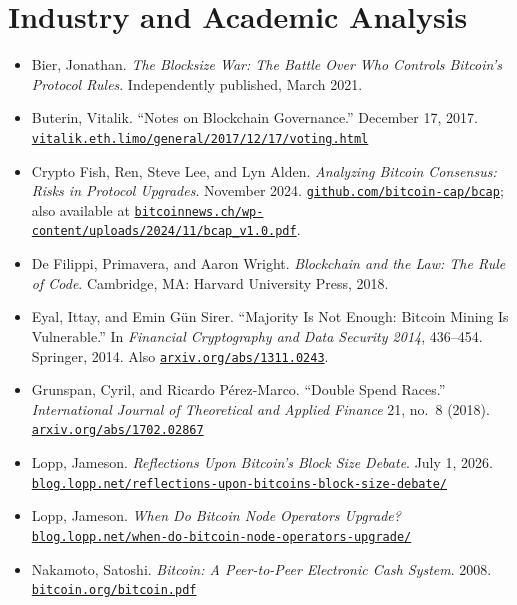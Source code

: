 \documentclass[11pt, twoside, openright]{book}
\begin{document}
\section*{Industry and Academic Analysis}
\begin{itemize}[leftmargin=1.5em, itemsep=4pt]
  \item Bier, Jonathan. \textit{The Blocksize War: The Battle Over Who Controls Bitcoin's Protocol Rules}. Independently published, March 2021.
  \item Buterin, Vitalik. ``Notes on Blockchain Governance.'' December 17, 2017. \href{https://vitalik.eth.limo/general/2017/12/17/voting.html}{\nolinkurl{vitalik.eth.limo/general/2017/12/17/voting.html}}
  \item Crypto Fish, Ren, Steve Lee, and Lyn Alden. \textit{Analyzing Bitcoin Consensus: Risks in Protocol Upgrades}. November 2024. \href{https://github.com/bitcoin-cap/bcap}{\nolinkurl{github.com/bitcoin-cap/bcap}}; also available at \href{https://bitcoinnews.ch/wp-content/uploads/2024/11/bcap_v1.0.pdf}{\nolinkurl{bitcoinnews.ch/wp-content/uploads/2024/11/bcap_v1.0.pdf}}.
  \item De Filippi, Primavera, and Aaron Wright. \textit{Blockchain and the Law: The Rule of Code}. Cambridge, MA: Harvard University Press, 2018.
  \item Eyal, Ittay, and Emin G\"un Sirer. ``Majority Is Not Enough: Bitcoin Mining Is Vulnerable.'' In \textit{Financial Cryptography and Data Security 2014}, 436--454. Springer, 2014. Also \href{https://arxiv.org/abs/1311.0243}{\nolinkurl{arxiv.org/abs/1311.0243}}.
  \item Grunspan, Cyril, and Ricardo P\'erez-Marco. ``Double Spend Races.'' \textit{International Journal of Theoretical and Applied Finance} 21, no.~8 (2018). \href{https://arxiv.org/abs/1702.02867}{\nolinkurl{arxiv.org/abs/1702.02867}}
  \item Lopp, Jameson. \textit{Reflections Upon Bitcoin's Block Size Debate}. July 1, 2026. \href{https://blog.lopp.net/reflections-upon-bitcoins-block-size-debate/}{\nolinkurl{blog.lopp.net/reflections-upon-bitcoins-block-size-debate/}}
  \item Lopp, Jameson. \textit{When Do Bitcoin Node Operators Upgrade?} \href{https://blog.lopp.net/when-do-bitcoin-node-operators-upgrade/}{\nolinkurl{blog.lopp.net/when-do-bitcoin-node-operators-upgrade/}}
  \item Nakamoto, Satoshi. \textit{Bitcoin: A Peer-to-Peer Electronic Cash System}. 2008. \href{https://bitcoin.org/bitcoin.pdf}{\nolinkurl{bitcoin.org/bitcoin.pdf}}

\end{itemize}
\end{document}
